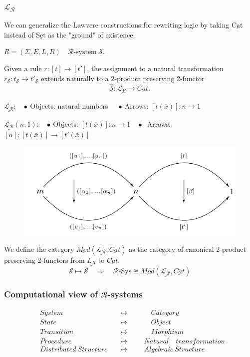 \documentclass{beamer}
\begin{document}
\begin{frame}
    \frametitle{$\mathcal{L_R}$}
    \scriptsize
    We can generalize the Lawvere constructions for rewriting logic by taking $\underline{\text{Cat}}$ instead of  $\underline{\text{Set}}$ as the "ground" of existence.

    \medskip
    $R=(\Sigma, E, L, R)\quad \mathcal{R}\text{-system}\ \mathcal{S}$.
    
    Given a rule $r:[t] \rightarrow [t']$, the assignment to a natural transformation $r_\mathcal{S}:t_\mathcal{S} \rightarrow t'_\mathcal{S}$ extends naturally to 
    a 2-product preserving 2-functor 
    $$\hat{\mathcal{S}}: \underline{\mathcal{L}_R} \rightarrow \underline{Cat}.$$

    
    $\underline{\mathcal{L_R}}$:$\quad \bullet\ $Objects: natural numbers $\quad \bullet\ $Arrows: $[t(\overline{x})]: n \rightarrow 1$

    \bigskip
    $\underline{\mathcal{L_R}}(n,1)$:$\quad \bullet\ $Objects: $[t(\overline{x})]: n \rightarrow 1 \quad \bullet\ $ Arrows:$  [\alpha]:[t(\overline{x})] \rightarrow [t'(\overline{x})]$

    \begin{figure}
        \includegraphics[scale=0.15]{img/comp.png}
    \end{figure}
    We define the category $\underline{Mod}(\underline{\mathcal{L_R}},\underline{Cat})$ as the category of canonical 2-product preserving 2-functors from 
    $\underline{L_R}$ to $ \underline{Cat}$.
    $$\mathcal{S} \mapsto \mathcal{\hat{S}}\quad \Rightarrow \quad \underline{\mathcal{R}\text{-Sys}} \cong \underline{Mod}(\underline{\mathcal{L_R}},\underline{Cat})$$
\end{frame}
\begin{frame}
    \frametitle{Computational view of $\mathcal{R}$-systems}
    \large
    \begin{align*}
        &System \quad &&\leftrightarrow  &&&\quad Category \\
        &State \quad &&\leftrightarrow &&&\quad  Object \\
        &Transition \quad &&\leftrightarrow &&&\quad Morphism \\ 
        &Procedure \quad &&\leftrightarrow &&&Natural \quad transformation \\ 
        &Distributed\ Structure\ &&\leftrightarrow &&& Algebraic\ Structure 
    \end{align*}
\end{frame}
\end{document}
